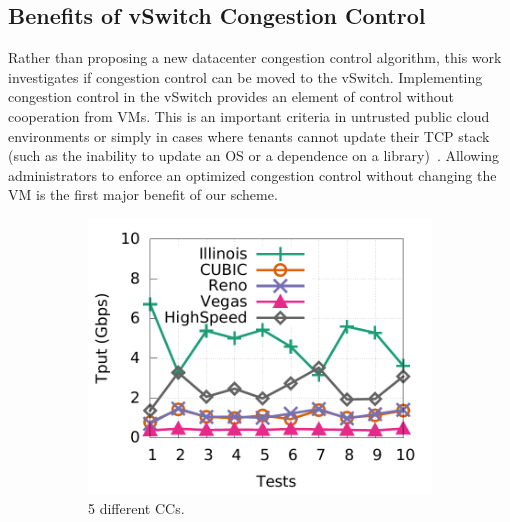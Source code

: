 \subsection{Benefits of vSwitch Congestion Control}
Rather than proposing a new datacenter congestion control algorithm, this work investigates
if congestion control can be moved to the vSwitch.
Implementing congestion control in the vSwitch provides an element of control without cooperation from
VMs. This is an important criteria in untrusted public cloud environments or simply in cases where tenants cannot update their TCP 
stack (such as the inability to update an OS or a dependence on a library)~\cite{judd2015nsdi}. 
Allowing administrators to enforce an optimized congestion control without
changing the VM is the first major benefit of our scheme.


\begin{figure}[!t]
        \centering
        \begin{subfigure}[b]{0.225\textwidth}
                \centering
		\includegraphics[width=\textwidth]{figures/tput_fairness/default_5CC_tput_detail.pdf}
		\caption{5 different CCs.}
                \label{unfairness_5CC}
        \end{subfigure}
        \begin{subfigure}[b]{0.225\textwidth}
                \centering

\end{subfigure}
\end{figure}
